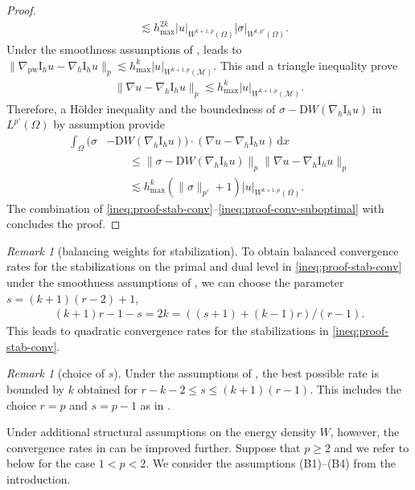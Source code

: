 \documentclass[a4paper]{amsart}
\numberwithin{equation}{section}
\renewcommand{\d}[1]{\,\mathrm{d}#1}
\newcommand{\I}{\mathrm{I}}
\newcommand{\Mcal}{\mathcal{M}}
\newcommand{\pw}{\mathrm{pw}}
\newcommand{\D}{\mathrm{D}}
\theoremstyle{remark}
\newtheorem{remark}[theorem]{Remark}
\begin{document}
\begin{proof}
\begin{align}
		&\lesssim h^{2k}_\mathrm{max}|u|_{W^{k+1,p}(\Omega)}|\sigma|_{W^{k,p'}(\Omega)}.
	\end{align}
	Under the smoothness assumptions of ,  leads to $\|\nabla_\pw \mathrm{I}_h u - \nabla_h \mathrm{I}_h u\|_{p} \lesssim h_\mathrm{max}^k|u|_{W^{k+1,p}(\Mcal)}$. This and a triangle inequality prove
	\begin{align*}
		\|\nabla u - \nabla_h \mathrm{I}_h u\|_{p} \lesssim h_\mathrm{max}^k|u|_{W^{k+1,p}(\Mcal)}.
	\end{align*}
	Therefore, a H\"older inequality and the boundedness of $\sigma - \D W(\nabla_h \I_h u)$ in $L^{p'}(\Omega)$ by assumption provide
	\begin{align}\label{ineq:proof-conv-suboptimal}
		\int_\Omega (\sigma &- \D W(\nabla_h \I_h u)) \cdot (\nabla u - \nabla_h \I_h u) \d{x}\nonumber\\
		&\qquad\leq \|\sigma - \D W(\nabla_h \mathrm{I}_h u)\|_{p}\|\nabla u - \nabla_h \mathrm{I}_h u\|_{p}\nonumber\\
		&\qquad\lesssim h_\mathrm{max}^k(\|\sigma\|_{p'} + 1)|u|_{W^{k+1,p}(\Omega)}.
	\end{align}
	The combination of \eqref{ineq:proof-stab-conv}--\eqref{ineq:proof-conv-suboptimal}  with  concludes the proof.
\end{proof}

\begin{remark}[balancing weights for stabilization]\label{rem:balancing-stab}
	To obtain balanced convergence rates for the stabilizations on the primal and dual level in \eqref{ineq:proof-stab-conv} under the smoothness assumptions of , we can choose the parameter $s = (k+1)(r-2)+1$,
	\begin{align*}
		(k+1)r-1-s = 2k = ((s+1)+(k-1)r)/(r-1).
	\end{align*}
	This leads to quadratic convergence rates for the stabilizations in \eqref{ineq:proof-stab-conv}.
\end{remark}

\begin{remark}[choice of $s$]
Under the assumptions of ,
the best possible rate is bounded by $k$
obtained for $r-k-2 \leq s \leq (k+1)(r-1)$. 
This includes the choice $r = p$ and $s = p-1$ as in \cite{BurmanErn2008}.
\end{remark}

Under additional structural assumptions on the energy density $W$, however, the convergence rates in  can be improved further.
Suppose that $p \geq 2$ and we refer to  below for the case $1 < p < 2$. We consider the assumptions (B1)--(B4) from the introduction.
\end{document}
